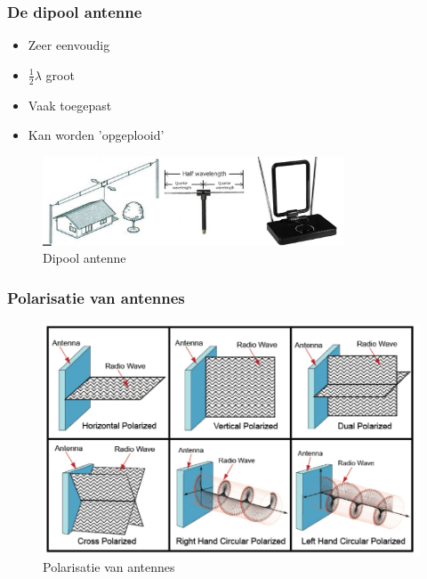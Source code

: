 \documentclass{article}
\begin{document}
\subsubsection{De dipool antenne}
\begin{itemize}
    \item Zeer eenvoudig
    \item $\frac12 \lambda$ groot
    \item Vaak toegepast
    \item Kan worden 'opgeplooid'
\end{itemize}

\begin{figure}[H]
    \centering
    \includegraphics[width=0.8\textwidth]{Screenshot_20200309_122306.png}
    \caption{Dipool antenne}
\end{figure}

\subsubsection{Polarisatie van antennes}
\begin{figure}[H]
    \centering
    \includegraphics[width=\textwidth]{Screenshot_20200516_162033.png}
    \caption{Polarisatie van antennes}
\end{figure}
\end{document}

